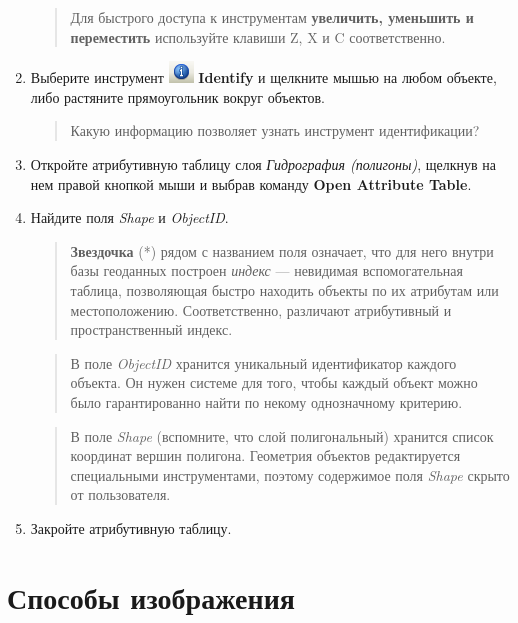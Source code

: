 \documentclass[12pt,]{book}
\begin{document}
\begin{enumerate}
  \begin{quote}
  Для быстрого доступа к инструментам \textbf{увеличить, уменьшить и переместить} используйте клавиши Z, X и C соответственно.
  \end{quote}
\item
  Выберите инструмент \includegraphics{images/Ex01/image14.png} \textbf{Identify} и щелкните мышью на любом объекте, либо растяните прямоугольник вокруг объектов.

  \begin{quote}
  Какую информацию позволяет узнать инструмент идентификации?
  \end{quote}
\item
  Откройте атрибутивную таблицу слоя \emph{Гидрография (полигоны)}, щелкнув на нем правой кнопкой мыши и выбрав команду \textbf{Open Attribute Table}.
\item
  Найдите поля \emph{Shape} и \emph{ObjectID}.

  \begin{quote}
  \textbf{Звездочка} (*) рядом с названием поля означает, что для него внутри базы геоданных построен \emph{индекс} --- невидимая вспомогательная таблица, позволяющая быстро находить объекты по их атрибутам или местоположению. Соответственно, различают атрибутивный и пространственный индекс.
  \end{quote}

  \begin{quote}
  В поле \emph{ObjectID} хранится уникальный идентификатор каждого объекта. Он нужен системе для того, чтобы каждый объект можно было гарантированно найти по некому однозначному критерию.
  \end{quote}

  \begin{quote}
  В поле \emph{Shape} (вспомните, что слой полигональный) хранится список координат вершин полигона. Геометрия объектов редактируется специальными инструментами, поэтому содержимое поля \emph{Shape} скрыто от пользователя.
  \end{quote}
\item
  Закройте атрибутивную таблицу.
\end{enumerate}

\hypertarget{map-design-quaternary-representations}{%
\section{Способы изображения}\label{map-design-quaternary-representations}}
\end{document}
